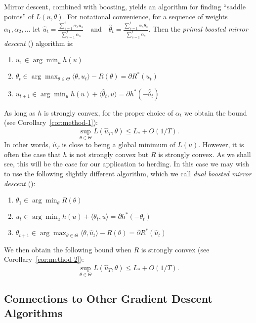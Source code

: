 \documentclass[paper.tex]{subfiles}
\begin{document}
Mirror descent, combined with boosting, yields an algorithm for finding 
``saddle points'' of $L(u, \theta)$. 
For notational convenience, for a sequence of weights $\alpha_1,\alpha_2,\ldots$ 
let 
\(
\hat{u}_t = \frac{\sum_{s=1}^t \alpha_su_s}{\sum_{s=1}^t \alpha_s} 
\quad \text{and} \quad 
\hat{\theta}_t = \frac{\sum_{s=1}^t \alpha_s\theta_s}{\sum_{s=1}^t \alpha_s}.
\)
Then 
the {\em primal boosted mirror descent} (\primal) algorithm is:
\begin{enumerate}
\item $u_1 \in \arg\min_u h(u)$
\item $\theta_{t} \in \arg\max_{\theta \in \Theta} \langle \theta, u_t \rangle - R(\theta) = \partial R^{*}(u_{t})$
\item $u_{t+1} \in \arg\min_{u} h(u) + \langle \hat{\theta}_t, u \rangle = \partial h^{*}(-\hat\theta_{t})$
\end{enumerate}
As long as $h$ is strongly convex, for the proper choice of $\alpha_{t}$ we obtain the 
bound (see Corollary~\ref{cor:method-1}):
\begin{equation}
\sup_{\theta \in \Theta} L(\hat{u}_T, \theta) \leq L_{*} + O(1/T).
\end{equation}
In other words, $\hat{u}_T$ is close to being a global minimum of $L(u)$.
However, it is often the case that $h$ is not strongly convex but $R$ is strongly convex. As we shall see, this will be the case for our application to herding.
In this case we may wish to use the following slightly different algorithm, which we call {\em dual boosted mirror descent} (\dual):
\begin{enumerate}
\item $\theta_1 \in \arg\min_{\theta} R(\theta)$
\item $u_t \in \arg\min_{u} h(u) + \langle \theta_t, u \rangle = \partial h^{*}(-\theta_{t})$
\item $\theta_{t+1} \in \arg\max_{\theta \in \Theta} \langle \theta, \hat{u}_t \rangle - R(\theta) = \partial R^{*}(\hat u_{t})$
\end{enumerate}
We then obtain the following bound 
when $R$ is strongly convex (see Corollary~\ref{cor:method-2}):
\[ \sup_{\theta \in \Theta} L(\hat{u}_T, \theta) \leq L_{*} + O(1/T). \]



\subsection{Connections to Other Gradient Descent Algorithms}
\end{document}
